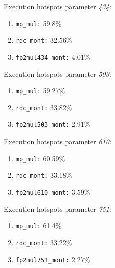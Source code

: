 Execution hotspots parameter \textit{434}:
\begin{enumerate}[noitemsep]
	\item \texttt{mp\_mul:} 59.8\%
	\item \texttt{rdc\_mont:} 32.56\%
	\item \texttt{fp2mul434\_mont:} 4.01\%
\end{enumerate}
Execution hotspots parameter \textit{503}:
\begin{enumerate}[noitemsep]
	\item \texttt{mp\_mul:} 59.27\%
	\item \texttt{rdc\_mont:} 33.82\%
	\item \texttt{fp2mul503\_mont:} 2.91\%
\end{enumerate}
Execution hotspots parameter \textit{610}:
\begin{enumerate}[noitemsep]
	\item \texttt{mp\_mul:} 60.59\%
	\item \texttt{rdc\_mont:} 33.18\%
	\item \texttt{fp2mul610\_mont:} 3.59\%
\end{enumerate}
Execution hotspots parameter \textit{751}:
\begin{enumerate}[noitemsep]
	\item \texttt{mp\_mul:} 61.4\%
	\item \texttt{rdc\_mont:} 33.22\%
	\item \texttt{fp2mul751\_mont:} 2.27\%
\end{enumerate}

